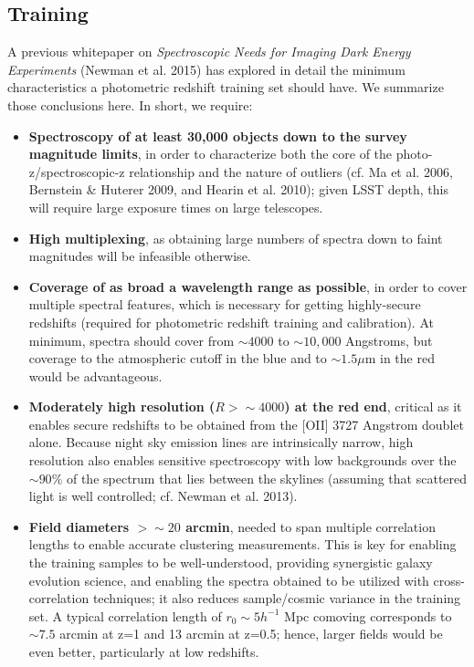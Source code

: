 \subsection{Training}

A previous whitepaper on {\it Spectroscopic Needs for Imaging Dark Energy Experiments} (Newman et al. 2015) has explored in detail the minimum characteristics a photometric redshift training set should have.  We summarize those conclusions here.  In short, we require:

\begin{itemize}

\item {\bf Spectroscopy of at least 30,000 objects down to the survey magnitude limits}, in order to characterize both the core of the photo-z/spectroscopic-z relationship and the nature of outliers (cf. Ma et al. 2006, Bernstein \& Huterer 2009, and Hearin et al. 2010); given LSST depth, this will require large exposure times on large telescopes.

\item {\bf High multiplexing}, as obtaining large numbers of spectra down to faint magnitudes will be infeasible otherwise.

\item {\bf Coverage of as broad a wavelength range as possible}, in order to cover multiple spectral features, which is necessary for getting highly-secure redshifts (required for photometric redshift training and calibration).  At minimum, spectra should cover from $\sim 4000$ to $\sim 10,000$ Angstroms, but coverage to the atmospheric cutoff in the blue and to $\sim 1.5\mu$m in the red would be advantageous.

\item {\bf Moderately high resolution ($R>\sim 4000$) at the red end}, critical as it enables secure redshifts to be obtained from the [OII] 3727 Angstrom doublet alone.  Because night sky emission lines are intrinsically narrow, high resolution also enables sensitive spectroscopy with low backgrounds over the $\sim 90\%$ of the spectrum that lies between the skylines (assuming that scattered light is well controlled; cf. Newman et al. 2013).

\item {\bf Field diameters $>\sim20$ arcmin}, needed to span multiple correlation lengths to enable accurate clustering measurements.  This is key for enabling the training samples to be well-understood, providing synergistic galaxy evolution science, and enabling the spectra obtained to be utilized with cross-correlation techniques; it also reduces sample/cosmic variance in the training set.  A typical correlation length of $r_0 \sim 5 h^{-1}$ Mpc comoving corresponds to $\sim 7.5$ arcmin at z=1 and 13 arcmin at z=0.5; hence, larger fields would be even better, particularly at low redshifts.


\end{itemize}
